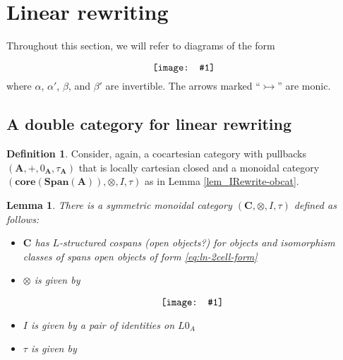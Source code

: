 \documentclass{amsart}
\newcommand{\A}{\cat{A}}
\newcommand{\C}{\cat{C}}
\newcommand{\core}{\mathbf{core}}
\newcommand{\cat}[1]{\mathbf{#1}}
\newcommand{\diagram}[1]{\raisebox{-0.5\height}{\texttt{[image: \#1]}}}
\newcommand{\Span}{\mathbf{Span}}
\newcommand{\edit}[1]{\textcolor{editcolour}{(#1)}}
\newtheorem{lemma}[theorem]{Lemma}
\theoremstyle{remark}
\theoremstyle{definition}
\newtheorem{definition}[theorem]{Definition}
\begin{document}

\section{Linear rewriting}
\label{sec:linear-rewriting}


Throughout this section, we will refer to diagrams of the form
\begin{equation}
  \label{eq:ln-2cell-form}
  \diagram{diag_lr_dbl-mon-rewrite-2cell}
\end{equation}
where $ \alpha $, $ \alpha' $, $ \beta $, and $ \beta' $ are
invertible. The arrows marked ``$ \rightarrowtail $'' are monic.


\subsection{A double category for linear rewriting}
\label{sec:dble-cat-linr-rewr}

\begin{definition} \label{def:mon-rewrite-obcat}
  Consider, again, a cocartesian category with pullbacks
  $ (\A , + , 0_{\A} , \tau_\A ) $
  that is locally cartesian closed and a monoidal category
  $ ( \core ( \Span ( \A )) , \otimes , I , \tau )$
  as in Lemma \ref{lem_IRewrite-obcat}.
\end{definition}

\begin{lemma} \label{thm:mon-rewrite-arrcat}
  There is a symmetric monoidal category
  $ ( \C , \otimes , I , \tau ) $ defined as follows:
  \begin{itemize}
   \item $ \C $ has $ L $-structured cospans \edit{open objects?}
          for objects and isomorphism classes of spans open objects of
          form \eqref{eq:ln-2cell-form}
   \item $ \otimes $ is given by
         \[
            \diagram{diag_lr_dbl-rewrite-tensor}
         \]
   \item $ I $ is given by a pair of identities on $ L0_A $
   \item $ \tau $ is given by
        \begin{center}
          \diagram{diag_lr_dbl-rewrite-braiding}
        \end{center}
   \end{itemize}
\end{lemma}
\end{document}
